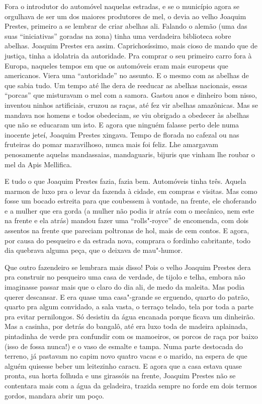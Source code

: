 Fora o introdutor do automóvel naquelas estradas, e se o município agora
se orgulhava de ser um dos maiores produtores de mel, o devia ao velho
Joaquim Prestes, primeiro a se lembrar de criar abelhas ali. Falando o
alemão (uma das suas ``iniciativas'' goradas na zona) tinha uma
verdadeira biblioteca sobre abelhas. Joaquim Prestes era assim.
Caprichosíssimo, mais cioso de mando que de justiça, tinha a idolatria
da autoridade. Pra comprar o seu primeiro carro fora à Europa, naqueles
tempos em que os automóveis eram mais europeus que americanos. Viera uma
``autoridade'' no assunto. E o mesmo com as abelhas de que sabia tudo.
Um tempo até lhe dera de reeducar as abelhas nacionais, essas ``porcas''
que misturavam o mel com a samora. Gastou anos e dinheiro bom nisso,
inventou ninhos artificiais, cruzou as raças, até fez vir abelhas
amazônicas. Mas se mandava nos homens e todos obedeciam, se viu obrigado
a obedecer às abelhas que não se educaram um isto. E agora que ninguém
falasse perto dele numa inocente jeteí, Joaquim Prestes xingava. Tempo
de florada no cafezal ou nas fruteiras do pomar maravilhoso, nunca mais
foi feliz. Lhe amargavam penosamente aquelas mandassaias, mandaguaris,
bijuris que vinham lhe roubar o mel da Apis Mellifica.

E tudo o que Joaquim Prestes fazia, fazia bem. Automóveis tinha três.
Aquela marmon de luxo pra o levar da fazenda à cidade, em compras e
visitas. Mas como fosse um bocado estreita para que coubessem à vontade,
na frente, ele choferando e a mulher que era gorda (a mulher não podia
ir atrás com o mecânico, nem este na frente e ela atrás) mandou fazer
uma ``rolls"-royce'' de encomenda, com dois assentos na frente que
pareciam poltronas de hol, mais de cem contos. E agora, por causa do
pesqueiro e da estrada nova, comprara o fordinho cabritante, todo dia
quebrava alguma peça, que o deixava de mau"-humor.

Que outro fazendeiro se lembrara mais disso! Pois o velho Joaquim
Prestes dera pra construir no pesqueiro uma casa de verdade, de tijolo e
telha, embora não imaginasse passar mais que o claro do dia ali, de medo
da maleita. Mas podia querer descansar. E era quase uma casa"-grande se
erguendo, quarto do patrão, quarto pra algum convidado, a sala vasta, o
terraço telado, tela por toda a parte pra evitar pernilongos. Só
desistiu da água encanada porque ficava um dinheirão. Mas a casinha, por
detrás do bangalô, até era luxo toda de madeira aplainada, pintadinha de
verde pra confundir com os mamoeiros, os porcos de raça por baixo (isso
de fossa nunca!) e o vaso de esmalte e tampa. Numa parte destocada do
terreno, já pastavam no capim novo quatro vacas e o marido, na espera de
que alguém quisesse beber um leitezinho caracu. E agora que a casa
estava quase pronta, sua horta folhuda e uns girassóis na frente,
Joaquim Prestes não se contentara mais com a água da geladeira, trazida
sempre no forde em dois termos gordos, mandara abrir um poço.

